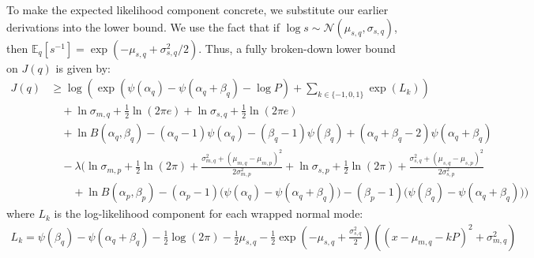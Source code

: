 To make the expected likelihood component concrete, we substitute our earlier derivations into the lower bound.
We use the fact that if $\log s \sim \mathcal{N}(\mu_{s,q}, \sigma_{s,q})$, then $\mathbb{E}_q[s^{-1}] = \exp(-\mu_{s,q} + \sigma_{s,q}^2 / 2)$.
Thus, a fully broken-down lower bound on $J(q)$ is given by:
\begin{align*}
    J(q) &\geq \log \left( \exp\left( \psi(\alpha_q) - \psi(\alpha_q + \beta_q) - \log P \right) + \sum_{k \in \{-1, 0, 1\}} \exp\left( L_k \right) \right) \\
    &\quad + \ln \sigma_{m,q} + \tfrac{1}{2}\ln(2\pi e)
    + \ln \sigma_{s,q} + \tfrac{1}{2}\ln(2\pi e) \\
    &\quad + \ln B(\alpha_q, \beta_q) - (\alpha_q - 1)\psi(\alpha_q) - (\beta_q - 1)\psi(\beta_q) + (\alpha_q + \beta_q - 2)\psi(\alpha_q + \beta_q) \\
    &\quad - \lambda \Biggl(
        \ln \sigma_{m,p} + \tfrac{1}{2}\ln(2\pi) + \frac{\sigma_{m,q}^2 + (\mu_{m,q} - \mu_{m,p})^2}{2\sigma_{m,p}^2}
        + \ln \sigma_{s,p} + \tfrac{1}{2}\ln(2\pi) + \frac{\sigma_{s,q}^2 + (\mu_{s,q} - \mu_{s,p})^2}{2\sigma_{s,p}^2} \\
    &\qquad + \ln B(\alpha_p, \beta_p) - (\alpha_p - 1)\bigl(\psi(\alpha_q) - \psi(\alpha_q + \beta_q)\bigr)
        - (\beta_p - 1)\bigl(\psi(\beta_q) - \psi(\alpha_q + \beta_q)\bigr)
    \Biggr)
\end{align*}
where $L_k$ is the log-likelihood component for each wrapped normal mode:
\begin{align*}
    L_k = \psi(\beta_q) - \psi(\alpha_q + \beta_q) - \frac{1}{2}\log(2\pi) - \frac{1}{2}\mu_{s,q} - \frac{1}{2} \exp\left(-\mu_{s,q} + \frac{\sigma_{s,q}^2}{2}\right) \left((x - \mu_{m,q} - k P)^2 + \sigma_{m,q}^2\right)
\end{align*}

